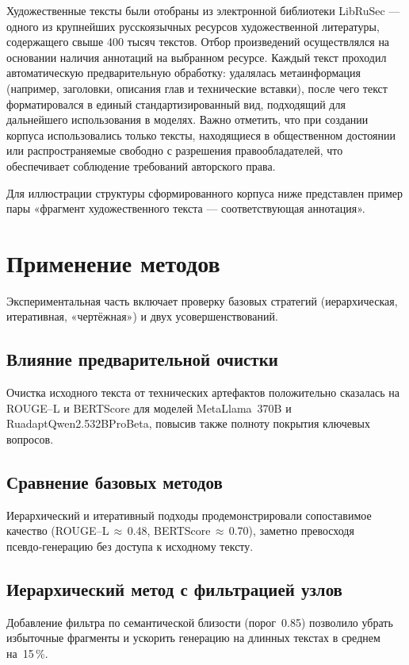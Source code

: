 \documentclass{article}
\theoremstyle{definition}
\theoremstyle{plain}
\begin{document}
Художественные тексты были отобраны из электронной библиотеки LibRuSec — одного из крупнейших русскоязычных ресурсов художественной литературы, содержащего свыше 400 тысяч текстов. 
Отбор произведений осуществлялся на основании наличия аннотаций на выбранном ресурсе. Каждый текст проходил автоматическую предварительную обработку: удалялась метаинформация (например, заголовки, описания глав и технические вставки), 
после чего текст форматировался в единый стандартизированный вид, подходящий для дальнейшего использования в моделях.
Важно отметить, что при создании корпуса использовались только тексты, находящиеся в общественном достоянии или распространяемые свободно с разрешения правообладателей, что обеспечивает соблюдение требований авторского права.

Для иллюстрации структуры сформированного корпуса ниже представлен пример пары «фрагмент художественного текста — соответствующая аннотация».
\section*{Применение методов}
Экспериментальная часть включает проверку базовых стратегий (иерархическая, итеративная, «чертёжная») и двух усовершенствований.

\subsection*{Влияние предварительной очистки}
Очистка исходного текста от технических артефактов положительно сказалась на ROUGE--L и BERTScore для моделей Meta\-Llama~3\-70B и Ru\-adapt\-Qwen2.5\-32B\-Pro\-Beta, повысив также полноту покрытия ключевых вопросов.

\subsection*{Сравнение базовых методов}
Иерархический и итеративный подходы продемонстрировали сопоставимое качество (ROUGE--L\,$\approx$\,0.48, BERTScore\,$\approx$\,0.70), заметно превосходя псевдо‑генерацию без доступа к исходному тексту.

\subsection*{Иерархический метод с фильтрацией узлов}
Добавление фильтра по семантической близости (порог~0.85) позволило убрать избыточные фрагменты и ускорить генерацию на длинных текстах в среднем на~15\,\%.
\end{document}
